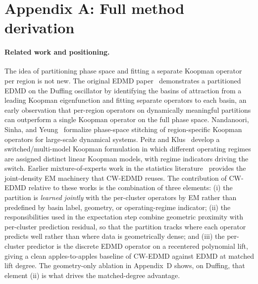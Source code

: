 \documentclass{article}
\begin{document}
\raggedbottom

\section*{Appendix A: Full method derivation}

\paragraph{Related work and positioning.} The idea of partitioning phase space and fitting a separate Koopman operator per region is not new. The original EDMD paper~\citep{williams2015edmd} demonstrates a partitioned EDMD on the Duffing oscillator by identifying the basins of attraction from a leading Koopman eigenfunction and fitting separate operators to each basin, an early observation that per-region operators on dynamically meaningful partitions can outperform a single Koopman operator on the full phase space. Nandanoori, Sinha, and Yeung~\citep{sinha2020phase} formalize phase-space stitching of region-specific Koopman operators for large-scale dynamical systems. Peitz and Klus~\citep{peitz2019switched} develop a switched/multi-model Koopman formulation in which different operating regimes are assigned distinct linear Koopman models, with regime indicators driving the switch. Earlier mixture-of-experts work in the statistics literature~\citep{jordan1994hme,gershenfeld1999nature,ingrassia2014linear,punzo2014polynomial} provides the joint-density EM machinery that CW-EDMD reuses. The contribution of CW-EDMD relative to these works is the combination of three elements: (i) the partition is \emph{learned jointly} with the per-cluster operators by EM rather than predefined by basin label, geometry, or operating-regime indicator; (ii) the responsibilities used in the expectation step combine geometric proximity with per-cluster prediction residual, so that the partition tracks where each operator predicts well rather than where data is geometrically dense; and (iii) the per-cluster predictor is the discrete EDMD operator on a recentered polynomial lift, giving a clean apples-to-apples baseline of CW-EDMD against EDMD at matched lift degree. The geometry-only ablation in Appendix~D shows, on Duffing, that element (ii) is what drives the matched-degree advantage.
\end{document}
